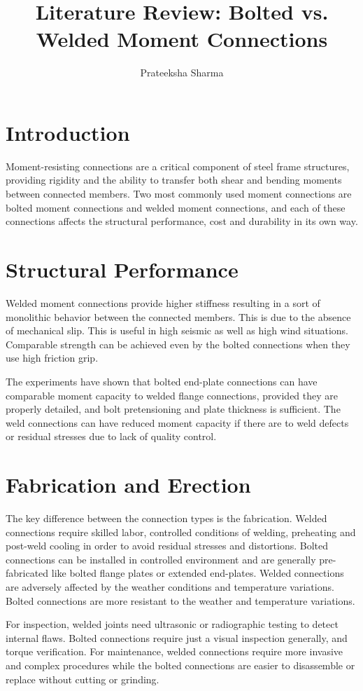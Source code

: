 \documentclass[12pt,a4paper]{article}
\title{Literature Review: Bolted vs. Welded Moment Connections}
\author{Prateeksha Sharma}
\date{}
\begin{document}
\maketitle

\section{Introduction}
Moment-resisting connections are a critical component of steel frame structures, providing rigidity and the ability to transfer both shear and bending moments between connected members. Two most commonly used moment connections are bolted moment connections and welded moment connections, and each of these connections affects the structural performance, cost and durability in its own way.

\section{Structural Performance}
Welded moment connections provide higher stiffness resulting in a sort of monolithic behavior between the connected members. This is due to the absence of mechanical slip. This is useful in high seismic as well as high wind situations. Comparable strength can be achieved even by the bolted connections when they use high friction grip.

The experiments have shown that bolted end-plate connections can have comparable moment capacity to welded flange connections, provided they are properly detailed, and bolt pretensioning and plate thickness is sufficient.
 The weld connections can have reduced moment capacity if there are to weld defects or residual stresses due to lack of quality control.

\section{Fabrication and Erection}
The key difference between the connection types is the fabrication. 
Welded connections require skilled labor, controlled conditions of welding, preheating and post-weld cooling in order to avoid residual stresses and distortions. Bolted connections can be installed in controlled environment and are generally pre-fabricated like bolted flange plates or extended end-plates.
Welded connections are adversely affected by the weather conditions and temperature variations. Bolted connections are more resistant to the weather and temperature variations.

For inspection, welded joints need ultrasonic or radiographic testing to detect internal flaws. Bolted connections require just a visual inspection generally, and torque verification.
For maintenance, welded connections require more invasive and complex procedures while the bolted connections are easier to disassemble or replace without cutting or grinding.
\end{document}
